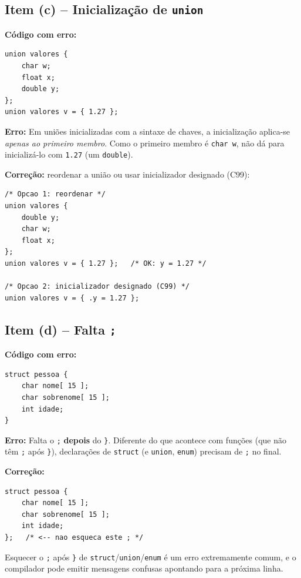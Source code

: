 \documentclass[12pt,a4paper]{article}
\begin{document}
\subsection*{Item (c) -- Inicialização de \texttt{union}}
\begin{respostabox}
\textbf{Código com erro:}
\begin{lstlisting}
union valores {
    char w;
    float x;
    double y;
};
union valores v = { 1.27 };
\end{lstlisting}

\textbf{Erro:} Em uniões inicializadas com a sintaxe de chaves, a inicialização
aplica-se \textit{apenas ao primeiro membro}. Como o primeiro membro é \texttt{char w},
não dá para inicializá-lo com \texttt{1.27} (um \texttt{double}).

\textbf{Correção:} reordenar a união ou usar inicializador designado (C99):
\begin{lstlisting}
/* Opcao 1: reordenar */
union valores {
    double y;
    char w;
    float x;
};
union valores v = { 1.27 };   /* OK: y = 1.27 */

/* Opcao 2: inicializador designado (C99) */
union valores v = { .y = 1.27 };
\end{lstlisting}
\end{respostabox}

\subsection*{Item (d) -- Falta \texttt{;}}
\begin{respostabox}
\textbf{Código com erro:}
\begin{lstlisting}
struct pessoa {
    char nome[ 15 ];
    char sobrenome[ 15 ];
    int idade;
}
\end{lstlisting}

\textbf{Erro:} Falta o \texttt{;} \textbf{depois} do \texttt{\}}. Diferente do que
acontece com funções (que não têm \texttt{;} após \texttt{\}}), declarações de
\texttt{struct} (e \texttt{union}, \texttt{enum}) precisam de \texttt{;} no final.

\textbf{Correção:}
\begin{lstlisting}
struct pessoa {
    char nome[ 15 ];
    char sobrenome[ 15 ];
    int idade;
};   /* <-- nao esqueca este ; */
\end{lstlisting}

\begin{erroco}
  Esquecer o \texttt{;} após \texttt{\}} de \texttt{struct}/\texttt{union}/\texttt{enum}
  é um erro extremamente comum, e o compilador pode emitir mensagens confusas
  apontando para a próxima linha.
\end{erroco}
\end{respostabox}
\end{document}
